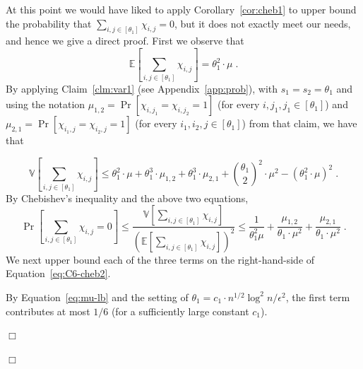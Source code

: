 \documentclass{article}
\newcommand{\eps}{\epsilon}
\newcommand{\Ex}{\mathbb{E}}
\newcommand{\Var}{\mathbb{V}}
\newenvironment{proof}{\smallskip\noindent{\bf Proof:}}%
        {\hspace*{\fill}$\Box$\par}
\newcommand{\commentt}[1]{ {}}
\newcommand{\ForFuture}[1]{}
\begin{document}
\begin{proof}
\begin{proof}
At this point we would have liked to apply Corollary~\ref{cor:cheb1} to upper bound the probability that
$\sum_{i,j\in [\theta_1]} \chi_{i,j}=0$, but it does not exactly meet our needs, and hence we give a direct proof.
First we observe that 
\begin{equation}
  \Ex\left[\sum_{i,j\in [\theta_1]}\chi_{i,j}\right] = \theta_1^2\cdot \mu\;.  
\end{equation}
By applying Claim~\ref{clm:var1} (see Appendix~\ref{app:prob}), with $s_1=s_2=\theta_1$ and using the notation $\mu_{1,2} = \Pr[\chi_{i,j_1}=\chi_{i,j_2}=1]$ (for every $i,j_1,j_1\in [\theta_1]$) and
$\mu_{2,1} = \Pr[\chi_{i_1,j} = \chi_{i_2,j} = 1]$ (for every $i_1,i_2,j\in [\theta_1]$) from that claim, we have that
\ForFuture{T: add elaboration}
\begin{equation}\label{eq:var-sum-chis}
    \Var\left[\sum_{i,j\in [\theta_1]}\chi_{i,j}\right] \leq \theta_1^2\cdot \mu + \theta_1^3 \cdot \mu_{1,2} + \theta_1^3 \cdot \mu_{2,1} + {\theta_1\choose 2}^2\cdot \mu^2 - (\theta_1^2\cdot \mu)^2\;.
\end{equation}
By Chebishev's inequality and the above two equations,
\begin{equation}\label{eq:C6-cheb2}
\Pr\left[\sum_{i,j\in [\theta_1]}\chi_{i,j}=0\right] \leq \frac{\Var\left[\sum_{i,j\in [\theta_1]}\chi_{i,j}\right]}{\left(\Ex\left[\sum_{i,j\in [\theta_1]}\chi_{i,j}\right]\right)^2}
\leq  \frac{1}{\theta_1^2\mu} + \frac{\mu_{1,2}}{\theta_1\cdot \mu^2} + \frac{\mu_{2,1}}{\theta_1\cdot \mu^2} \;.
\end{equation}
We next upper bound each of the three terms on the right-hand-side of Equation~\eqref{eq:C6-cheb2}.

By Equation~\eqref{eq:mu-lb} and the setting of $\theta_1=c_1\cdot n^{1/2}\log^2 n/\eps^2$, the first term contributes at most $1/6$ (for a sufficiently large constant $c_1$). %



\end{proof}
\end{proof}
\end{document}
